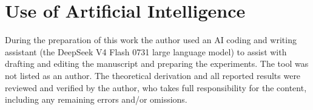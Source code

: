 \documentclass[conference]{IEEEtran}
\begin{document}
\section*{Use of Artificial Intelligence}
During the preparation of this work the author used an AI coding and writing assistant (the
DeepSeek V4 Flash 0731 large language model) to assist with drafting and editing the
manuscript and preparing the experiments. The tool was not listed as an author. The
theoretical derivation and all reported results were reviewed and verified by the author,
who takes full responsibility for the content, including any remaining errors and/or omissions.
\end{document}
